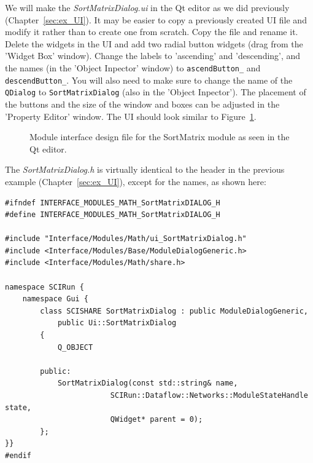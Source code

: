 \documentclass[fleqn,11pt,openany]{book}
\begin{document}
We will make the \emph{SortMatrixDialog.ui} in the Qt editor as we did previously (Chapter~\ref{sec:ex_UI}).  
It may be easier to copy a previously created UI file and modify it rather than to create one from scratch.  
Copy the \emph{} file and rename it.
Delete the widgets in the UI and add two radial button widgets (drag from the 'Widget Box' window).
Change the labels to 'ascending' and 'descending', and the names (in the 'Object Inpector' window) to \verb|ascendButton_| and \verb|descendButton_|.  
You will also need to make sure to change the name of the \verb|QDialog| to \verb|SortMatrixDialog| (also in the 'Object Inpector').
The placement of the buttons and the size of the window and boxes can be adjusted in the 'Property Editor' window.
The UI should look similar to Figure~\ref{fig:algoUI}.

\begin{figure}[H]
\caption{Module interface design file for the SortMatrix module as seen in the Qt editor.}
\label{fig:algoUI}
\end{figure}

The \emph{SortMatrixDialog.h} is virtually identical to the header in the previous example (Chapter~\ref{sec:ex_UI}), except for the names, as shown here:
\begin{verbatim}
#ifndef INTERFACE_MODULES_MATH_SortMatrixDIALOG_H
#define INTERFACE_MODULES_MATH_SortMatrixDIALOG_H

#include "Interface/Modules/Math/ui_SortMatrixDialog.h"
#include <Interface/Modules/Base/ModuleDialogGeneric.h>
#include <Interface/Modules/Math/share.h>

namespace SCIRun {
	namespace Gui {
		class SCISHARE SortMatrixDialog : public ModuleDialogGeneric,
			public Ui::SortMatrixDialog
		{
			Q_OBJECT

		public:
			SortMatrixDialog(const std::string& name,
						SCIRun::Dataflow::Networks::ModuleStateHandle state,
						QWidget* parent = 0);
		};
}}
#endif
\end{verbatim}
\end{document}

